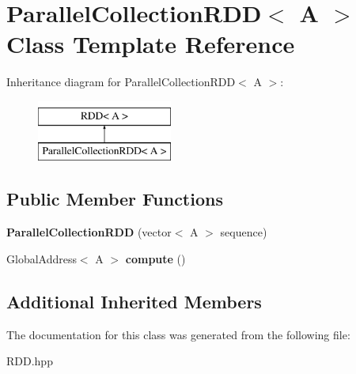 \hypertarget{class_parallel_collection_r_d_d}{}\section{Parallel\+Collection\+R\+D\+D$<$ A $>$ Class Template Reference}
\label{class_parallel_collection_r_d_d}
Inheritance diagram for Parallel\+Collection\+R\+D\+D$<$ A $>$\+:\begin{figure}[H]
\begin{center}
\leavevmode
\includegraphics[height=2.000000cm]{class_parallel_collection_r_d_d}
\end{center}
\end{figure}
\subsection*{Public Member Functions}
\begin{DoxyCompactItemize}
\item 
\hypertarget{class_parallel_collection_r_d_d_ab0978f72535ee1744d26e785b66471ce}{}{\bfseries Parallel\+Collection\+R\+D\+D} (vector$<$ A $>$ sequence)\label{class_parallel_collection_r_d_d_ab0978f72535ee1744d26e785b66471ce}

\item 
\hypertarget{class_parallel_collection_r_d_d_ae68b0397be4483120fe2084fbb09f2b1}{}Global\+Address$<$ A $>$ {\bfseries compute} ()\label{class_parallel_collection_r_d_d_ae68b0397be4483120fe2084fbb09f2b1}

\end{DoxyCompactItemize}
\subsection*{Additional Inherited Members}


The documentation for this class was generated from the following file\+:\begin{DoxyCompactItemize}
\item 
R\+D\+D.\+hpp\end{DoxyCompactItemize}
